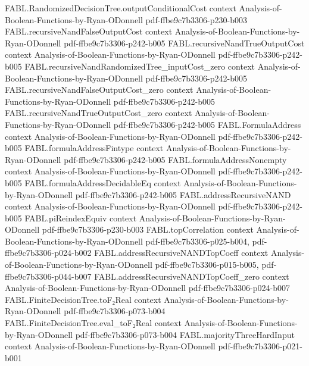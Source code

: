 \begin{theorem}
\proofstep
  {FABL.RandomizedDecisionTree.outputConditionalCost}
  {context}
  {Analysis-of-Boolean-Functions-by-Ryan-ODonnell}
  {pdf-ffbe9c7b3306-p230-b003}
\proofstep
  {FABL.recursiveNandFalseOutputCost}
  {context}
  {Analysis-of-Boolean-Functions-by-Ryan-ODonnell}
  {pdf-ffbe9c7b3306-p242-b005}
\proofstep
  {FABL.recursiveNandTrueOutputCost}
  {context}
  {Analysis-of-Boolean-Functions-by-Ryan-ODonnell}
  {pdf-ffbe9c7b3306-p242-b005}
\proofstep
  {FABL.recursiveNandRandomizedTree_inputCost_zero}
  {context}
  {Analysis-of-Boolean-Functions-by-Ryan-ODonnell}
  {pdf-ffbe9c7b3306-p242-b005}
\proofstep
  {FABL.recursiveNandFalseOutputCost_zero}
  {context}
  {Analysis-of-Boolean-Functions-by-Ryan-ODonnell}
  {pdf-ffbe9c7b3306-p242-b005}
\proofstep
  {FABL.recursiveNandTrueOutputCost_zero}
  {context}
  {Analysis-of-Boolean-Functions-by-Ryan-ODonnell}
  {pdf-ffbe9c7b3306-p242-b005}
\proofstep
  {FABL.FormulaAddress}
  {context}
  {Analysis-of-Boolean-Functions-by-Ryan-ODonnell}
  {pdf-ffbe9c7b3306-p242-b005}
\proofstep
  {FABL.formulaAddressFintype}
  {context}
  {Analysis-of-Boolean-Functions-by-Ryan-ODonnell}
  {pdf-ffbe9c7b3306-p242-b005}
\proofstep
  {FABL.formulaAddressNonempty}
  {context}
  {Analysis-of-Boolean-Functions-by-Ryan-ODonnell}
  {pdf-ffbe9c7b3306-p242-b005}
\proofstep
  {FABL.formulaAddressDecidableEq}
  {context}
  {Analysis-of-Boolean-Functions-by-Ryan-ODonnell}
  {pdf-ffbe9c7b3306-p242-b005}
\proofstep
  {FABL.addressRecursiveNAND}
  {context}
  {Analysis-of-Boolean-Functions-by-Ryan-ODonnell}
  {pdf-ffbe9c7b3306-p242-b005}
\proofstep
  {FABL.piReindexEquiv}
  {context}
  {Analysis-of-Boolean-Functions-by-Ryan-ODonnell}
  {pdf-ffbe9c7b3306-p230-b003}
\proofstep
  {FABL.topCorrelation}
  {context}
  {Analysis-of-Boolean-Functions-by-Ryan-ODonnell}
  {pdf-ffbe9c7b3306-p025-b004,
    pdf-ffbe9c7b3306-p024-b002}
\proofstep
  {FABL.addressRecursiveNANDTopCoeff}
  {context}
  {Analysis-of-Boolean-Functions-by-Ryan-ODonnell}
  {pdf-ffbe9c7b3306-p015-b005,
    pdf-ffbe9c7b3306-p044-b007}
\proofstep
  {FABL.addressRecursiveNANDTopCoeff_zero}
  {context}
  {Analysis-of-Boolean-Functions-by-Ryan-ODonnell}
  {pdf-ffbe9c7b3306-p024-b007}
\proofstep
  {FABL.FiniteDecisionTree.toF₂Real}
  {context}
  {Analysis-of-Boolean-Functions-by-Ryan-ODonnell}
  {pdf-ffbe9c7b3306-p073-b004}
\proofstep
  {FABL.FiniteDecisionTree.eval_toF₂Real}
  {context}
  {Analysis-of-Boolean-Functions-by-Ryan-ODonnell}
  {pdf-ffbe9c7b3306-p073-b004}
\proofstep
  {FABL.majorityThreeHardInput}
  {context}
  {Analysis-of-Boolean-Functions-by-Ryan-ODonnell}
  {pdf-ffbe9c7b3306-p021-b001}

\end{theorem}
